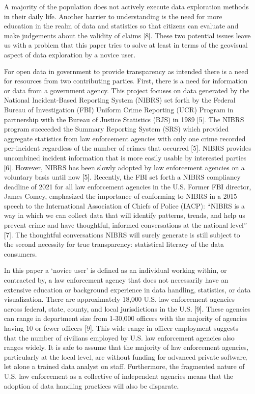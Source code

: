 \documentclass[runningheads]{llncs}
\begin{document}
A majority of the population does not actively execute data exploration methods in their daily life. Another barrier to understanding is the need for more education in the realm of data and statistics so that citizens can evaluate and make judgements about the validity of claims [8]. These two potential issues leave us with a problem that this paper tries to solve at least in terms of the geovisual aspect of data exploration by a novice user.

For open data in government to provide transparency as intended there is a need for resources from two contributing parties. First, there is a need for information or data from a government agency. This project focuses on data generated by the National Incident-Based Reporting System (NIBRS) set forth by the Federal Bureau of Investigation (FBI) Uniform Crime Reporting (UCR) Program in partnership with the Bureau of Justice Statistics (BJS) in 1989 [5]. The NIBRS program succeeded the Summary Reporting System (SRS) which provided aggregate statistics from law enforcement agencies with only one crime recorded per-incident regardless of the number of crimes that occurred [5]. NIBRS provides uncombined incident information that is more easily usable by interested parties [6]. However, NIBRS has been slowly adopted by law enforcement agencies on a voluntary basis until now [5]. Recently, the FBI set forth a NIBRS compliancy deadline of 2021 for all law enforcement agencies in the U.S. Former FBI director, James Comey, emphasized the importance of conforming to NIBRS in a 2015 speech to the International Association of Chiefs of Police (IACP): “NIBRS is a way in which we can collect data that will identify patterns, trends, and help us prevent crime and have thoughtful, informed conversations at the national level” [7]. The thoughtful conversations NIBRS will surely generate is still subject to the second necessity for true transparency: statistical literacy of the data consumers. 

In this paper a ‘novice user’ is defined as an individual working within, or contracted by, a law enforcement agency that does not necessarily have an extensive education or background experience in data handling, statistics, or data visualization. There are approximately 18,000 U.S. law enforcement agencies across federal, state, county, and local jurisdictions in the U.S. [9]. These agencies can range in department size from 1-30,000 officers with the majority of agencies having 10 or fewer officers [9]. This wide range in officer employment suggests that the number of civilians employed by U.S. law enforcement agencies also ranges widely. It is safe to assume that the majority of law enforcement agencies, particularly at the local level, are without funding for advanced private software, let alone a trained data analyst on staff. Furthermore, the fragmented nature of U.S. law enforcement as a collective of independent agencies means that the adoption of data handling practices will also be disparate. 
\end{document}
